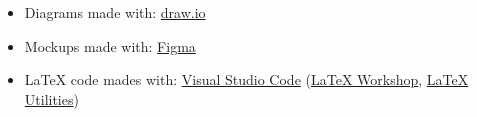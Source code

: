 \begin{itemize}
    \item Diagrams made with: \href{http://www.draw.io}{draw.io}
    \item Mockups made with: \href{https://www.figma.com/}{Figma}
    \item LaTeX code mades with: \href{https://code.visualstudio.com/}{Visual Studio Code} (\href{https://marketplace.visualstudio.com/items?itemName=James-Yu.latex-workshop}{LaTeX Workshop}, \href{https://marketplace.visualstudio.com/items?itemName=tecosaur.latex-utilities}{LaTeX Utilities})
\end{itemize}